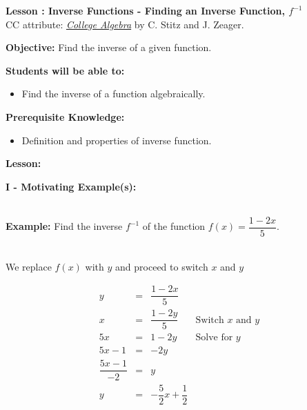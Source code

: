 \documentclass[12pt]{article}
\theoremstyle{definition}
\begin{document}
{\bf \large Lesson 
: Inverse Functions - Finding an Inverse Function, $f^{-1}$}
\\ CC attribute: \href{http://www.stitz-zeager.com}{\it{College Algebra}} by C. Stitz and J. Zeager. 
\hfill \doclicenseImage[imagewidth=5em]\\
\par
{\bf Objective:} 	Find the inverse of a given function.\\  
\par
{\bf Students will be able to:}
\begin{itemize}
	\item Find the inverse of a function algebraically.
\end{itemize}
{\bf Prerequisite Knowledge:}
\begin{itemize}
	\item Definition and properties of inverse function.
\end{itemize}
\hrulefill

{\bf Lesson:}
\begin{center}
\end{center}

{\bf I - Motivating Example(s):}\\
\ \par
{\bf Example:}  Find the inverse $f^{-1}$ of the function $f(x)=\dfrac{1-2x}{5}$.\\
\ \par
We replace $f(x)$ with $y$ and proceed to switch $x$ and $y$

\[ \begin{array}{rcll}
y & = &  \dfrac{1-2x}{5} & \\ [6pt]
x & = & \dfrac{1-2y}{5} & \mbox{Switch $x$ and $y$} \\ [6pt]
5x & = & 1 - 2y & \mbox{Solve for $y$} \\ [6pt]
5x-1 & = & -2y & \\ 
\dfrac{5x-1}{-2} & = & y & \\ 
y & = & -\dfrac{5}{2} x + \dfrac{1}{2} & 
\end{array} \]
\end{document}
